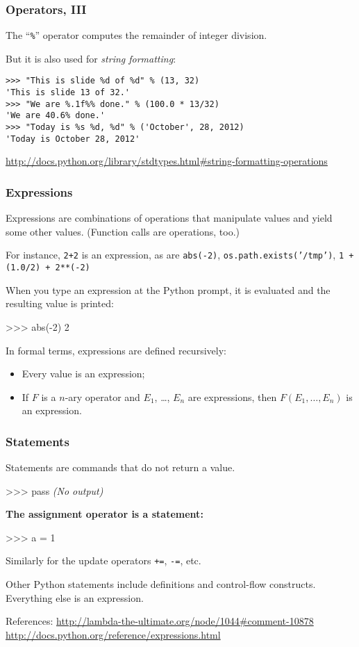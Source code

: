 \documentclass[english,serif,mathserif,xcolor=pdftex,dvipsnames,table]{beamer}
\begin{document}
\begin{frame}[fragile]
  \frametitle{Operators, III}
  The ``\texttt{\%}'' operator computes the remainder of integer division.

  \+ 
  But it is also used for \emph{string formatting}:
\begin{lstlisting}[showstringspaces=false]
>>> "This is slide %d of %d" % (13, 32)
'This is slide 13 of 32.'
>>> "We are %.1f%% done." % (100.0 * 13/32)
'We are 40.6% done.'
>>> "Today is %s %d, %d" % ('October', 28, 2012)
'Today is October 28, 2012'
\end{lstlisting}

  \begin{references}
    \url{http://docs.python.org/library/stdtypes.html#string-formatting-operations}
  \end{references}
\end{frame}


\begin{frame}[fragile]
  \frametitle{Expressions}

  Expressions are combinations of operations that manipulate values
  and yield some other values.  (Function calls are operations, too.)

  \+ 
  For instance, \texttt{2+2} is an expression, as are
  \texttt{abs(-2)}, \texttt{os.path.exists('/tmp')},
  \texttt{1 + (1.0/2) + 2**(-2)}

  \+ 
  When you type an expression at the Python prompt,
  it is evaluated and the resulting value is printed:
\begin{semiverbatim}
>>> abs(-2)
2
\end{semiverbatim}

  \+\scriptsize
  In formal terms, expressions are defined recursively:
  \begin{itemize}
  \item Every value is an expression;
  \item If $F$ is a $n$-ary operator and $E_1$, \ldots, $E_n$ are
    expressions, then $F(E_1, \ldots, E_n)$ is an expression.
  \end{itemize}
\end{frame}


\begin{frame}[fragile]
  \frametitle{Statements}
  Statements are commands that do not return a value.
\begin{semiverbatim}
>>> pass
{\small\it (No output)}
\end{semiverbatim}

  \+
  \textbf{The assignment operator is a statement:}
\begin{semiverbatim}
>>> a = 1
\end{semiverbatim}
  Similarly for the update operators \texttt{+=}, \texttt{-=}, etc.

  \+
  Other Python statements include definitions and
  control-flow constructs.  Everything else is an expression. 

  \+\scriptsize
  References:
  \url{http://lambda-the-ultimate.org/node/1044#comment-10878}
  \url{http://docs.python.org/reference/expressions.html}
  
\end{frame}
\end{document}
